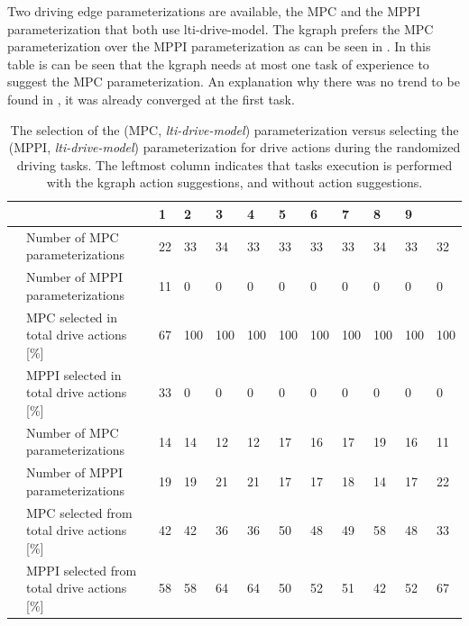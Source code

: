 Two driving edge parameterizations are available, the \ac{MPC} and the \ac{MPPI} parameterization that both use lti-drive-model. The \ac{kgraph} prefers the \ac{MPC} parameterization over the \ac{MPPI} parameterization as can be seen in . In this table is can be seen that the \ac{kgraph} needs at most one task of experience to suggest the \ac{MPC} parameterization. An explanation why there was no trend to be found in , it was already converged at the first task.  

\begin{table}[H]
    \caption{The selection of the (\ac{MPC}, \textit{lti-drive-model}) parameterization versus selecting the (\ac{MPPI}, \textit{lti-drive-model}) parameterization for drive actions during the randomized driving tasks. The leftmost column indicates that tasks execution is performed with the \ac{kgraph} action suggestions, and without action suggestions.}%
    \label{table:rand_drive_mpc_vs_mppi}
    \centering
    \begin{tabular}%
      {%
        >{\raggedright\arraybackslash}p{}
        >{\raggedright\arraybackslash}p{}
      |p{0.4cm}p{0.4cm}p{0.4cm}p{0.4cm}p{0.4cm}p{0.4cm}p{0.4cm}p{0.4cm}p{0.4cm}p{0.4cm}}
      \multicolumn{2}{c|}{Number of Tasks in experience} &0&1&2&3&4&5&6&7&8&9\\\toprule
      \multirow{4}{0.1\textwidth}{With \ac{kgraph} suggestions} 
      &Number of \ac{MPC} parameterizations&22&33&34&33&33&33&33&34&33&32\\
      &Number of \ac{MPPI} parameterizations&11&0&0&0&0&0&0&0&0&0\\
      & \ac{MPC} selected in total drive actions [\%]&67&100&100&100&100&100&100&100&100&100\\
      & \ac{MPPI} selected in total drive actions [\%]&33&0&0&0&0&0&0&0&0&0\\\midrule
      \multirow{4}{0.1\textwidth}{Without \ac{kgraph} suggestions} 
      &Number of \ac{MPC} parameterizations &14&14&12&12&17&16&17&19&16&11\\
      &Number of \ac{MPPI} parameterizations &19&19&21&21&17&17&18&14&17&22\\
      & \ac{MPC} selected from total drive actions [\%] &42&42&36&36&50&48&49&58&48&33\\
      & \ac{MPPI} selected from total drive actions [\%]&58&58&64&64&50&52&51&42&52&67\\
    \end{tabular}
\end{table}

